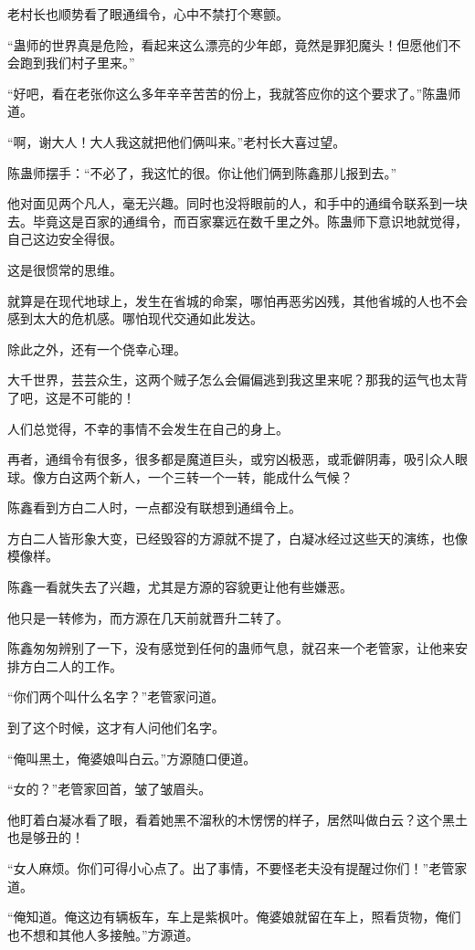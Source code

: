 \begin{this_body}
老村长也顺势看了眼通缉令，心中不禁打个寒颤。

“蛊师的世界真是危险，看起来这么漂亮的少年郎，竟然是罪犯魔头！但愿他们不会跑到我们村子里来。”

“好吧，看在老张你这么多年辛辛苦苦的份上，我就答应你的这个要求了。”陈蛊师道。

“啊，谢大人！大人我这就把他们俩叫来。”老村长大喜过望。

陈蛊师摆手：“不必了，我这忙的很。你让他们俩到陈鑫那儿报到去。”

他对面见两个凡人，毫无兴趣。同时也没将眼前的人，和手中的通缉令联系到一块去。毕竟这是百家的通缉令，而百家寨远在数千里之外。陈蛊师下意识地就觉得，自己这边安全得很。

这是很惯常的思维。

就算是在现代地球上，发生在省城的命案，哪怕再恶劣凶残，其他省城的人也不会感到太大的危机感。哪怕现代交通如此发达。

除此之外，还有一个侥幸心理。

大千世界，芸芸众生，这两个贼子怎么会偏偏逃到我这里来呢？那我的运气也太背了吧，这是不可能的！

人们总觉得，不幸的事情不会发生在自己的身上。

再者，通缉令有很多，很多都是魔道巨头，或穷凶极恶，或乖僻阴毒，吸引众人眼球。像方白这两个新人，一个三转一个一转，能成什么气候？

陈鑫看到方白二人时，一点都没有联想到通缉令上。

方白二人皆形象大变，已经毁容的方源就不提了，白凝冰经过这些天的演练，也像模像样。

陈鑫一看就失去了兴趣，尤其是方源的容貌更让他有些嫌恶。

他只是一转修为，而方源在几天前就晋升二转了。

陈鑫匆匆辨别了一下，没有感觉到任何的蛊师气息，就召来一个老管家，让他来安排方白二人的工作。

“你们两个叫什么名字？”老管家问道。

到了这个时候，这才有人问他们名字。

“俺叫黑土，俺婆娘叫白云。”方源随口便道。

“女的？”老管家回首，皱了皱眉头。

他盯着白凝冰看了眼，看着她黑不溜秋的木愣愣的样子，居然叫做白云？这个黑土也是够丑的！

“女人麻烦。你们可得小心点了。出了事情，不要怪老夫没有提醒过你们！”老管家道。

“俺知道。俺这边有辆板车，车上是紫枫叶。俺婆娘就留在车上，照看货物，俺们也不想和其他人多接触。”方源道。


\end{this_body}
